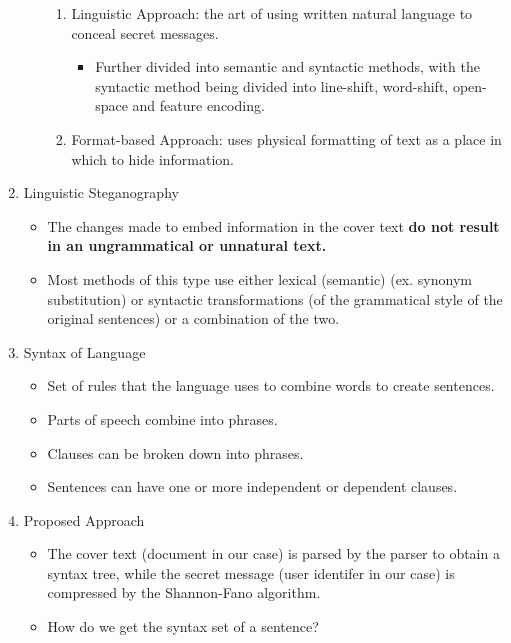 \documentclass{article}
\begin{document}
\begin{enumerate}
\begin{itemize}
\begin{enumerate}
\item Linguistic Approach: the art of using written natural language to conceal secret messages.
\begin{itemize}
    \item Further divided into semantic and syntactic methods, with the syntactic method being divided into line-shift, word-shift, open-space and feature encoding.
\end{itemize}
\item Format-based Approach: uses physical formatting of text as a place in which to hide information.
\end{enumerate}
\end{itemize}
\item Linguistic Steganography
\begin{itemize}
\item The changes made to embed information in the cover text \textbf{do not result in an ungrammatical or unnatural text.}
\item Most methods of this type use either lexical (semantic) (ex. synonym substitution) or syntactic transformations (of the grammatical style of the original sentences) or a combination of the two.
\end{itemize}
\item Syntax of Language
\begin{itemize}
\item Set of rules that the language uses to combine words to create sentences.
\item Parts of speech combine into phrases.
\item Clauses can be broken down into phrases.
\item Sentences can have one or more independent or dependent clauses.
\end{itemize}
\item Proposed Approach
\begin{itemize}
\item The cover text (document in our case) is parsed by the parser to obtain a syntax tree, while the secret message (user identifer in our case) is compressed by the Shannon-Fano algorithm.
\item How do we get the syntax set of a sentence?
\end{itemize}
\end{enumerate}
\end{document}

